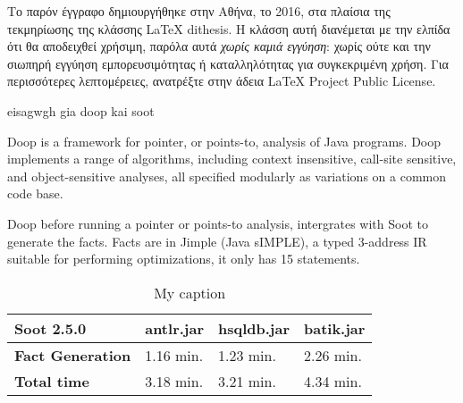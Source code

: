 \documentclass{dithesis}
\begin{document}
\tableofcontents
\listoffigures
\listoftables

\begin{thesisprologue}[Πρόλογος]
    Το παρόν έγγραφο δημιουργήθηκε στην Αθήνα, το 2016, στα πλαίσια της 
    τεκμηρίωσης της κλάσσης \LaTeX{} dithesis.
    Η κλάσση αυτή διανέμεται με την ελπίδα ότι θα αποδειχθεί χρήσιμη, παρόλα αυτά 
    \emph{χωρίς καμιά εγγύηση}: χωρίς ούτε και την σιωπηρή εγγύηση 
    εμπορευσιμότητας ή καταλληλότητας για συγκεκριμένη χρήση.
    Για περισσότερες λεπτομέρειες, ανατρέξτε στην άδεια LaTeX Project Public 
    License.
\end{thesisprologue}

    eisagwgh gia doop kai soot

    Doop is a framework for pointer, or points-to, analysis of Java programs. 
    Doop implements a range of algorithms, including context insensitive, call-site sensitive, 
    and object-sensitive analyses, all specified modularly as variations on a common code base.
    
        Doop before running a pointer or points-to analysis, intergrates with Soot to generate
        the facts. Facts are in Jimple (Java sIMPLE), a typed 3-address IR suitable for performing
        optimizations, it only has 15 statements.

        \begin{table}[H]
        \centering
        \caption{My caption}
        \label{my-label}
        \begin{tabular}{llll}
        \hline
        \textbf{Soot 2.5.0}      & \textbf{antlr.jar} & \textbf{hsqldb.jar} & \textbf{batik.jar} \\ \hline
        \textbf{Fact Generation} & 1.16 min.          & 1.23 min.           & 2.26 min.          \\
        \textbf{Total time}      & 3.18 min.          & 3.21 min.           & 4.34 min.          \\ \hline
        \end{tabular}
        \end{table}

\end{document}
